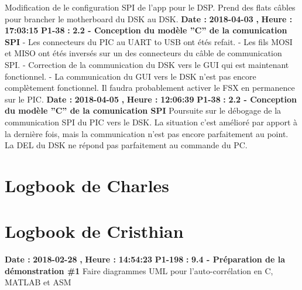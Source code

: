\documentclass{article}%
\begin{document}
\newline%
\newline%
%
Modification de le configuration SPI de l'app pour le DSP. Prend des flats câbles pour brancher le motherboard du DSK au DSK. \newline%
\newline%
%
\textbf{Date : }%
\textbf{2018{-}04{-}03}%
\textbf{,}%
\textbf{ Heure : }%
\textbf{17:03:15}%
\newline%
%
\textbf{P1{-}38 }%
\textbf{ : }%
\textbf{ 2.2 {-} Conception du modèle ''C'' de la comunication SPI}%
\newline%
\newline%
%
{-} Les connecteurs du PIC au UART to USB ont étés refait.\newline%
{-} Les fils MOSI et MISO ont étés inversés sur un des connecteurs du câble de communication SPI.\newline%
{-} Correction de la communication du DSK vers le GUI qui est maintenant fonctionnel. \newline%
{-} La communication du GUI vers le DSK n'est pas encore complètement fonctionnel. Il faudra probablement activer le FSX en permanence sur le PIC. \newline%
\newline%
%
\textbf{Date : }%
\textbf{2018{-}04{-}05}%
\textbf{,}%
\textbf{ Heure : }%
\textbf{12:06:39}%
\newline%
%
\textbf{P1{-}38 }%
\textbf{ : }%
\textbf{ 2.2 {-} Conception du modèle ''C'' de la comunication SPI}%
\newline%
\newline%
%
Poursuite sur le débogage de la communication SPI du PIC vers le DSK. La situation c'est amélioré par apport à la dernière fois, mais la communication n'est pas encore parfaitement au point. La DEL du DSK ne répond pas parfaitement au commande du PC.\newline%
\newline%
%
\newpage

%
\section{Logbook de Charles}%
\newpage

%
\section{Logbook de Cristhian}%
\textbf{Date : }%
\textbf{2018{-}02{-}28}%
\textbf{,}%
\textbf{ Heure : }%
\textbf{14:54:23}%
\newline%
%
\textbf{P1{-}198 }%
\textbf{ : }%
\textbf{ 9.4 {-} Préparation de la démonstration \#1}%
\newline%
\newline%
%
Faire diagrammes UML pour l'auto{-}corrélation en C, MATLAB et ASM\newline%
\newline%
%
\newpage
\end{document}
